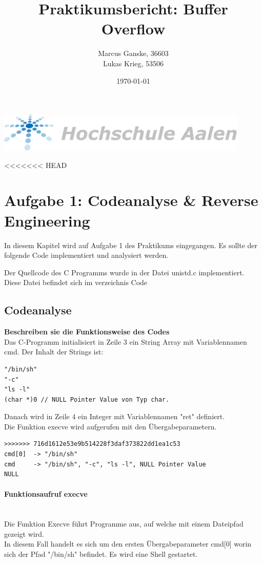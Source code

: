 \documentclass[12pt]{article}
\title{Praktikumsbericht: Buffer Overflow}
\author{Marcus Ganske, 36603\\
		Lukas Krieg, 53506}
\date{\today}
\begin{document}
\maketitle
\vspace{+8cm}{
}
\includegraphics[width=12cm]{Hochschule-aalen.pdf}

\newpage
\renewcommand\contentsname{Inhaltsverzeichnis}
\tableofcontents
\newpage


\newpage
<<<<<<< HEAD
	\section{Aufgabe 1: Codeanalyse \& Reverse Engineering}
		In diesem Kapitel wird auf Aufgabe 1 des Praktikums eingegangen.
		Es sollte der folgende Code implementiert und analysiert werden.
		

		Der Quellcode des C Programms wurde in der Datei unistd.c implementiert.
		Diese Datei befindet sich im verzeichnis Code

\subsection{Codeanalyse}
\textbf{Beschreiben sie die Funktionsweise des Codes}\\
Das C-Programm initialisiert in Zeile 3 ein String Array mit Variablennamen cmd. 
Der Inhalt der Strings ist: \\
\begin{lstlisting}
"/bin/sh"
"-c"
"ls -l"
(char *)0 // NULL Pointer Value von Typ char.
\end{lstlisting}
Danach wird in Zeile 4 ein Integer mit Variablennamen "ret" definiert.\\
Die Funktion execve wird aufgerufen mit den \"Ubergabeparametern.
\begin{lstlisting}
>>>>>>> 716d1612e53e9b514228f3daf373822dd1ea1c53
cmd[0] 	-> "/bin/sh"
cmd		-> "/bin/sh", "-c", "ls -l", NULL Pointer Value
NULL
			\end{lstlisting}

			\paragraph{Funktionsaufruf execve}
			~\\
			Die Funktion Execve f\"uhrt Programme aus, auf welche mit einem Dateipfad gezeigt wird.\\
			In diesem Fall handelt es sich um den ersten \"Ubergabeparameter cmd[0]
			worin sich der Pfad "/bin/sh" befindet. Es wird eine Shell gestartet.
\end{document}
